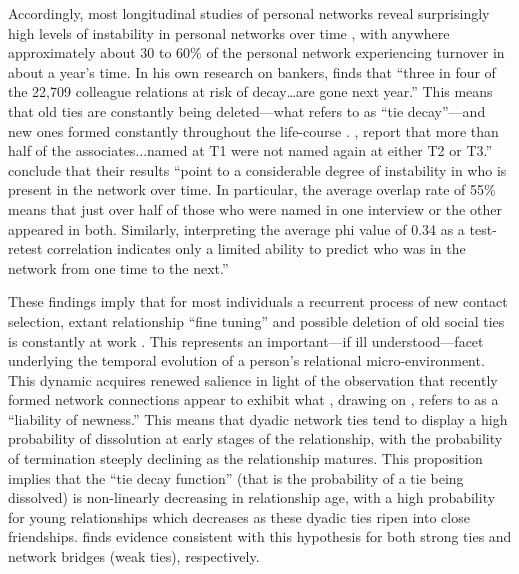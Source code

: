 Accordingly, most longitudinal studies of personal networks reveal surprisingly high levels of instability in personal networks over time \citep{lang00}, with anywhere approximately about 30 to 60\% of the personal network experiencing turnover in about a year's time.  In his own research on bankers, \citet[11]{burt00} finds that ``three in four of the 22,709 colleague relations at risk of decay{\ldots}are gone next year.'' This means that old ties are constantly being deleted---what \citet{burt00} refers to as ``tie decay''---and new ones formed constantly throughout the life-course \citet{suitor_etal97, wellman_etal97}.  \citet[57]{suitor_keeton97}, report that more than half of the associates...named at T1 were not named again at either T2 or T3.''   \citet[14]{morgan_etal97} conclude that their results ``point to a considerable degree of instability in who is present in the network over time. In particular, the average overlap rate of 55\% means that just over half of those who were named in one interview or the other appeared in both. Similarly, interpreting the average phi value of 0.34 as a test-retest correlation indicates only a limited ability to predict who was in the network from one time to the next.''

These findings imply that for most individuals a recurrent process of new contact selection, extant relationship ``fine tuning'' and possible deletion of old social ties is constantly at work \citep{lazarsfeld_merton54}.  This represents an important---if ill understood---facet underlying the temporal evolution of a person's relational micro-environment.   This dynamic acquires renewed salience in light of the observation that recently formed network connections appear to exhibit what \citet{burt00}, drawing on \citet[148--150]{stinchcombe65}, refers to as a ``liability of newness.'' This means that dyadic network ties tend to display a high probability of dissolution at early stages of the relationship, with the probability of termination steeply declining as the relationship matures. This proposition implies that the ``tie decay function'' (that is the probability of a tie being dissolved) is non-linearly decreasing in relationship age, with a high probability for young relationships which decreases as these dyadic ties ripen into close friendships.  \citet{burt00, burt02} finds evidence consistent with this hypothesis for both strong ties and network bridges (weak ties), respectively.

